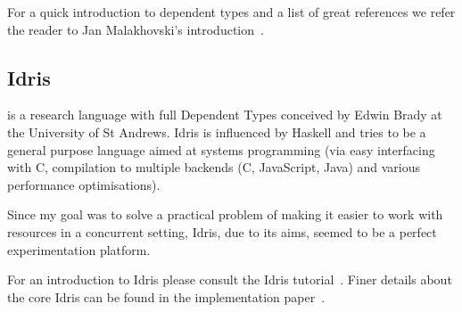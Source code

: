 For a quick introduction to dependent types and a list of great references we
refer the reader to Jan Malakhovski's introduction~\cite{deptypes-intro}.

\subsection{Idris}

\Idris{} is a research language with full Dependent Types conceived by Edwin
Brady at the University of St Andrews. Idris is influenced by Haskell and tries
to be a general purpose language aimed at systems programming (via easy
interfacing with C, compilation to multiple backends (C, JavaScript, Java) and
various performance optimisations).

Since my goal was to solve a practical problem of making it easier to work with
resources in a concurrent setting, Idris, due to its aims, seemed to be a perfect
experimentation platform.

For an introduction to Idris please consult the Idris
tutorial~\cite{idris-tutorial}. Finer details about the core Idris can be found
in the implementation paper~\cite{idris-impl}.
